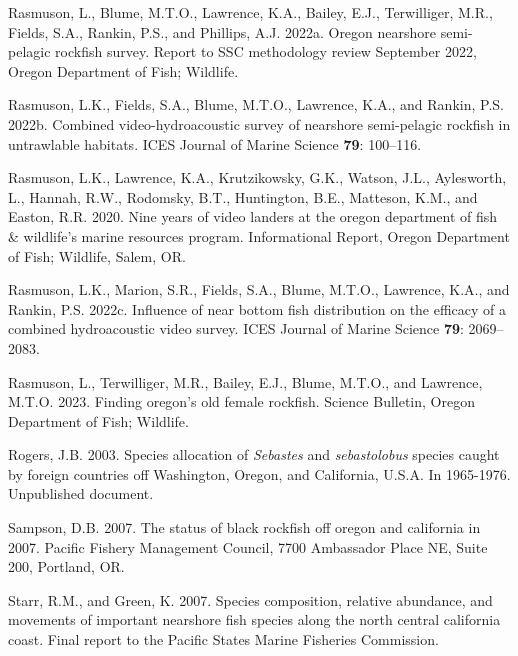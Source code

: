 \documentclass[11pt,
  english,
  letterpaper,
]{article}
\newlength{\cslhangindent}
\newenvironment{CSLReferences}[2] %
 {%
  \setlength{\parindent}{0pt}
  \ifodd #1 \everypar{\setlength{\hangindent}{\cslhangindent}}\ignorespaces\fi
  \ifnum #2 > 0
  \setlength{\parskip}{#2\baselineskip}
  \fi
 }%
 {}
\begin{document}
\begin{CSLReferences}{1}{0}
\leavevmode{}%
Rasmuson, L., Blume, M.T.O., Lawrence, K.A., Bailey, E.J., Terwilliger, M.R., Fields, S.A., Rankin, P.S., and Phillips, A.J. 2022a. Oregon nearshore semi-pelagic rockfish survey. Report to SSC methodology review September 2022, Oregon Department of Fish; Wildlife.

\leavevmode{}%
Rasmuson, L.K., Fields, S.A., Blume, M.T.O., Lawrence, K.A., and Rankin, P.S. 2022b. Combined video-hydroacoustic survey of nearshore semi-pelagic rockfish in untrawlable habitats. {ICES} Journal of Marine Science \textbf{79}: 100--116.

\leavevmode{}%
Rasmuson, L.K., Lawrence, K.A., Krutzikowsky, G.K., Watson, J.L., Aylesworth, L., Hannah, R.W., Rodomsky, B.T., Huntington, B.E., Matteson, K.M., and Easton, R.R. 2020. Nine years of video landers at the oregon department of fish \& wildlife's marine resources program. Informational Report, Oregon Department of Fish; Wildlife, Salem, {OR}.

\leavevmode{}%
Rasmuson, L.K., Marion, S.R., Fields, S.A., Blume, M.T.O., Lawrence, K.A., and Rankin, P.S. 2022c. Influence of near bottom fish distribution on the efficacy of a combined hydroacoustic video survey. {ICES} Journal of Marine Science \textbf{79}: 2069--2083.

\leavevmode{}%
Rasmuson, L., Terwilliger, M.R., Bailey, E.J., Blume, M.T.O., and Lawrence, M.T.O. 2023. Finding oregon's old female rockfish. Science Bulletin, Oregon Department of Fish; Wildlife.

\leavevmode{}%
Rogers, J.B. 2003. Species allocation of \emph{{Sebastes}} and \emph{sebastolobus} species caught by foreign countries off {Washington}, {Oregon}, and {California}, {U}.{S}.{A}. In 1965-1976. Unpublished document.

\leavevmode{}%
Sampson, D.B. 2007. The status of black rockfish off oregon and california in 2007. Pacific Fishery Management Council, 7700 Ambassador Place NE, Suite 200, Portland, OR.

\leavevmode{}%
Starr, R.M., and Green, K. 2007. Species composition, relative abundance, and movements of important nearshore fish species along the north central california coast. Final report to the Pacific States Marine Fisheries Commission.


\end{CSLReferences}
\end{document}
